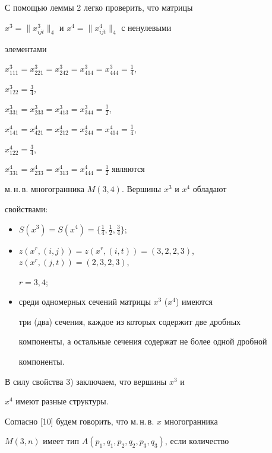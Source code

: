 \begin{exam}


С помощью леммы 2 легко проверить, что матрицы


$x^3=\|x_{ijt}^3\|_4$ и $x^4=\|x_{ijt}^4\|_4$  с ненулевыми


элементами


$x_{111}^3=x_{221}^3=x_{242}^3=x_{414}^3=x_{444}^3=\frac{1}{4}$,


$x_{122}^3=\frac{3}{4}$,


$x_{331}^3=x_{233}^3=x_{413}^3=x_{344}^3=\frac{1}{2}$,


$x_{141}^4=x_{421}^4=x_{212}^4=x_{244}^4=x_{414}^4=\frac{1}{4}$,


$x_{122}^4=\frac{3}{4}$,


$x_{331}^4=x_{233}^4=x_{313}^4=x_{444}^4=\frac{1}{2}$ являются


м.\,н.\,в. многогранника $M(3,4)$. Вершины $x^3$ и $x^4$ обладают


свойствами:


\begin{itemize}


\item[1)] $S(x^3)=S(x^4)=\{\frac{1}{4},\frac{1}{2},\frac{3}{4}\}$;


\item[2)] $z(x^r,(i,j))=z(x^r,(i,t))=(3,2,2,3)$, $z(x^r,(j,t))=(2,3,2,3)$,


$r=3,4$;


\item[3)] среди одномерных сечений матрицы $x^3$ ($x^4$) имеются


три (два) сечения, каждое из которых содержит две дробных


компоненты, а остальные сечения содержат не более одной дробной


компоненты.


\end{itemize}





В силу свойства 3) заключаем, что вершины $x^3$ и


$x^4$ имеют разные структуры.


\end{exam}





Согласно [10] будем говорить, что м.\,н.\,в. $x$ многогранника


$M(3,n)$ имеет тип $A(p_1,q_1,p_2,q_2,p_3,q_3)$, если количество


